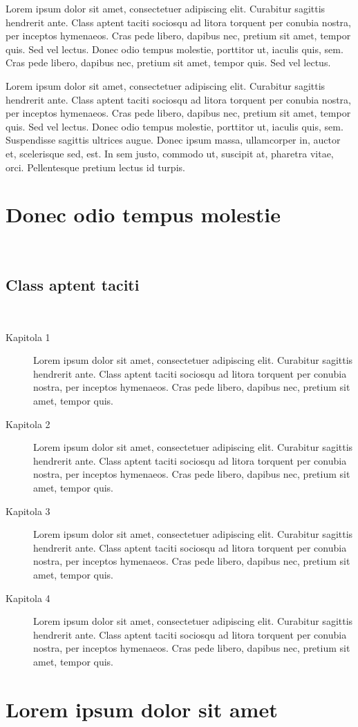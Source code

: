 \begin{chapterabstract}
	Lorem ipsum dolor sit amet, consectetuer adipiscing elit. Curabitur sagittis hendrerit ante. Class aptent taciti sociosqu ad litora torquent per conubia nostra, per inceptos hymenaeos. Cras pede libero, dapibus nec, pretium sit amet, tempor quis. Sed vel lectus. Donec odio tempus molestie, porttitor ut, iaculis quis, sem. Cras pede libero, dapibus nec, pretium sit amet, tempor quis. Sed vel lectus. 
\end{chapterabstract}

Lorem ipsum dolor sit amet, consectetuer adipiscing elit. Curabitur sagittis hendrerit ante. Class aptent taciti sociosqu ad litora torquent per conubia nostra, per inceptos hymenaeos. Cras pede libero, dapibus nec, pretium sit amet, tempor quis. Sed vel lectus. Donec odio tempus molestie, porttitor ut, iaculis quis, sem. Suspendisse sagittis ultrices augue. Donec ipsum massa, ullamcorper in, auctor et, scelerisque sed, est. In sem justo, commodo ut, suscipit at, pharetra vitae, orci. Pellentesque pretium lectus id turpis.~\cite{Kopka2004}

\section{Donec odio tempus molestie}

\lipsum[2]~\cite{def:1, def:2}

\subsection{Class aptent taciti}
\
\lipsum[2-3]

\begin{description}
\item[Kapitola 1] Lorem ipsum dolor sit amet, consectetuer adipiscing elit. Curabitur sagittis hendrerit ante. Class aptent taciti sociosqu ad litora tor\-quent per conubia nostra, per inceptos hymenaeos. Cras pede libero, dapibus nec, pretium sit amet, tempor quis.

\item[Kapitola 2] Lorem ipsum dolor sit amet, consectetuer adipiscing elit. Curabitur sagittis hendrerit ante. Class aptent taciti sociosqu ad litora tor\-quent per conubia nostra, per inceptos hymenaeos. Cras pede libero, dapibus nec, pretium sit amet, tempor quis.

\item[Kapitola 3] Lorem ipsum dolor sit amet, consectetuer adipiscing elit. Curabitur sagittis hendrerit ante. Class aptent taciti sociosqu ad litora tor\-quent per conubia nostra, per inceptos hymenaeos. Cras pede libero, dapibus nec, pretium sit amet, tempor quis.

\item[Kapitola 4] Lorem ipsum dolor sit amet, consectetuer adipiscing elit. Curabitur sagittis hendrerit ante. Class aptent taciti sociosqu ad litora tor\-quent per conubia nostra, per inceptos hymenaeos. Cras pede libero, dapibus nec, pretium sit amet, tempor quis.~\cite{jakZiskatAcko}
\end{description}

\lipsum[2]

\section{Lorem ipsum dolor sit amet}

\lipsum[3-5]
